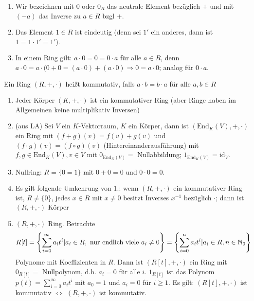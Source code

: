 \documentclass[12pt,a4paper]{scrartcl}
\begin{document}
\begin{bem} \leavevmode
	\begin{enumerate}
		\item Wir bezeichnen mit $0$ oder $0_R$ das neutrale Element bezüglich $+$ und mit $(-a)$ das Inverse zu $a\in R$ bzgl $+$.
		\item Das Element $1\in R$ ist eindeutig (denn sei $1'$ ein anderes, dann ist $1 = 1\cdot 1' = 1'$).
		\item In einem Ring gilt: $a\cdot 0 = 0 = 0\cdot a$ für alle $a\in R$, denn $a\cdot 0 = a\cdot (0+0 = (a\cdot 0)+(a\cdot 0)\Rightarrow 0 = a\cdot 0$; analog für $0\cdot a$.
	\end{enumerate}
\end{bem}

\begin{defi}
	Ein Ring $(R, +,\cdot)$ heißt kommutativ, falls $a\cdot b = b\cdot a$ für alle $a,b\in R$
\end{defi}	

\begin{bsp}
	\leavevmode
	\begin{enumerate}
		\item Jeder Körper $(K,+,\cdot)$ ist ein kommutativer Ring (aber Ringe haben im Allgemeinen keine multiplikativ Inversen)
		\item (aus LA) Sei $V$ ein $K$-Vektorraum, $K$ ein Körper, dann ist $(\text{End}_K(V),+,\cdot)$ ein Ring mit $(f+g)(v) = f(v)+g(v)$ und $(f\cdot g)(v) = (f\circ g)(v)$ (Hintereinanderausführung) mit $f,g\in \text{End}_K(V), v\in V$ mit $0_{\text{End}_K(V)} =$ Nullabbildung; $1_{\text{End}_K(V)} = \text{id}_V$.
		\item Nullring: $R = \{0=1\}$ mit $0+0 = 0$ und $0\cdot 0 = 0$.
		\item Es gilt folgende Umkehrung von $1.$: wenn $(R,+,\cdot)$ ein kommutativer Ring ist, $R\neq \{0\}$, jedes $x\in R$ mit $x\neq 0$ besitzt Inverses $x^{-1}$ bezüglich $\cdot$; dann ist $(R, +, \cdot )$ Körper
		\item $(R, +, \cdot)$ Ring. Betrachte
		$$ R[t] = \left\{ \sum_{i=0}^{\infty} a_it^i | a_i\in R, \text{ nur endlich viele }a_i\neq 0\right\}  = \left\{ \sum_{i=0}^{n} a_it^i | a_i\in R, n\in \mathbb N_0\right\}$$
		Polynome mit Koeffizienten in $R$. Dann ist $(R[t], +, \cdot)$ ein Ring mit $0_{R[t]} =$ Nullpolynom, d.h. $a_i = 0$ für alle $i$. $1_{R[t]}$ ist das Polynom $p(t) = \sum_{i = 0}^{\infty}a_it^i$ mit $a_0 = 1$ und $a_i = 0$ für $i\geq 1$.  Es gilt: $(R[t], +,\cdot)$ ist kommutativ $\Leftrightarrow$ $(R,+,\cdot)$ ist kommutativ.
	\end{enumerate}
\end{bsp}	
\end{document}
